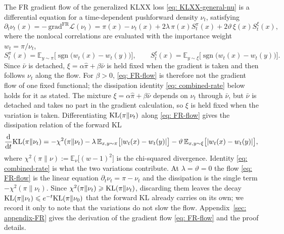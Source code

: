 \documentclass{article}
\begin{document}
The FR gradient flow of the generalized KLXX loss \eqref{eq: KLXX-general-nu} is a differential equation for a time-dependent pushforward density $\nu_t$, satisfying
\begin{equation}
	\partial_t\nu_t(x) = -\,\mathrm{grad}^{\mathrm{FR}}\mathcal L(\nu_t) = \pi(x)-\nu_t(x) + 2\lambda\,\pi(x)S^{\pi}_t(x) + 2\vartheta\,\xi(x)S^{\xi}_t(x),
	\label{eq: FR-flow}
\end{equation}
where the nonlocal correlations are evaluated with the importance weight $w_t=\pi/\nu_t$,
\begin{equation}
	S^{\pi}_t(x) = \mathbb E_{y\sim\pi}\bigl[\operatorname{sgn}\bigl(w_t(x)-w_t(y)\bigr)\bigr],
	\qquad
	S^{\xi}_t(x) = \mathbb E_{y\sim\xi}\bigl[\operatorname{sgn}\bigl(w_t(x)-w_t(y)\bigr)\bigr].
	\label{eq: FR-S-t}
\end{equation}
{\color{blue}Since $\bar\nu$ is detached, $\xi=\alpha\hat\pi+\beta\bar\nu$ is held fixed when the gradient is taken and then follows $\nu_t$ along the flow. For $\beta>0$, \eqref{eq: FR-flow} is therefore not the gradient flow of one fixed functional; the dissipation identity \eqref{eq: combined-rate} below holds for it as stated.}
The mixture $\xi=\alpha\hat\pi+\beta\bar\nu$ depends on $\nu_t$ through $\bar\nu$, but $\bar\nu$ is detached and takes no part in the gradient calculation, so $\xi$ is held fixed when the variation is taken. Differentiating $\mathrm{KL}(\pi\|\nu_t)$ along \eqref{eq: FR-flow} gives the dissipation relation of the forward KL
\begin{equation}
	\frac{\mathrm{d}}{\mathrm{d} t}\mathrm{KL}(\pi\|\nu_t) = -\chi^2(\pi\|\nu_t)
	- \lambda\,\mathbb E_{x,y\sim\pi}\bigl[|w_t(x)-w_t(y)|\bigr]
	- \vartheta\,\mathbb E_{x,y\sim\xi}\bigl[|w_t(x)-w_t(y)|\bigr],
	\label{eq: combined-rate}
\end{equation}
where $\chi^2(\pi\|\nu):=\mathbb E_{\nu}\bigl[(w-1)^2\bigr]$ is the chi-squared divergence. {\color{blue}Identity \eqref{eq: combined-rate} is what the two variations contribute. At $\lambda=\vartheta=0$ the flow \eqref{eq: FR-flow} is the linear equation $\partial_t\nu_t=\pi-\nu_t$ and the dissipation is the single term $-\chi^2(\pi\|\nu_t)$. Since $\chi^2(\pi\|\nu_t)\geqslant\mathrm{KL}(\pi\|\nu_t)$, discarding them leaves the decay $\mathrm{KL}(\pi\|\nu_t)\leqslant e^{-t}\mathrm{KL}(\pi\|\nu_0)$ that the forward KL already carries on its own; we record it only to note that the variations do not slow the flow.} Appendix~\ref{sec: appendix-FR} gives the derivation of the gradient flow \eqref{eq: FR-flow} and the proof details.
\end{document}
